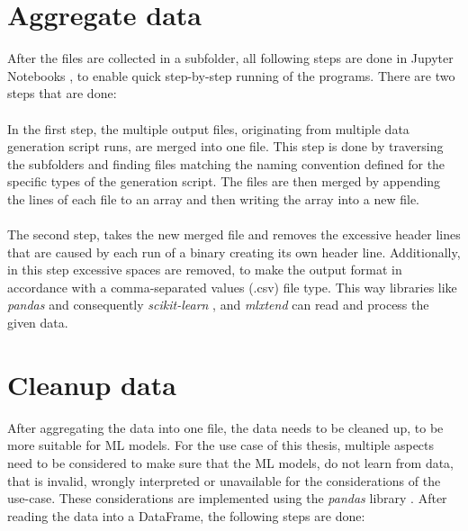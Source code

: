 \section{Aggregate data}

After the files are collected in a subfolder, all following steps are done in Jupyter Notebooks \parencite{jupyter:online}, to enable quick step-by-step running of the programs. There are two steps that are done: \\ \\
In the first step, the multiple output files, originating from multiple data generation script runs, are merged into one file. This step is done by traversing the subfolders and finding files matching the naming convention defined for the specific types of the generation script. The files are then merged by appending the lines of each file to an array and then writing the array into a new file.\\\\
The second step, takes the new merged file and removes the excessive header lines that are caused by each run of a binary creating its own header line. Additionally, in this step excessive spaces are removed, to make the output format in accordance with a comma-separated values (.csv) file type. This way libraries like \textit{pandas} \parencite{pandasdo55:online} and consequently \textit{scikit-learn} \parencite{scikitle99:online}, and \textit{mlxtend} \parencite{mlxtend35:online} can read and process the given data. 

\section{Cleanup data}

After aggregating the data into one file, the data needs to be cleaned up, to be more suitable for \ac{ML} models. For the use case of this thesis, multiple aspects need to be considered to make sure that the ML models, do not learn from data, that is invalid, wrongly interpreted or unavailable for the considerations of the use-case. These considerations are implemented using the \textit{pandas} library \parencite{pandasdo55:online}. After reading the data into a DataFrame, the following steps are done: \\
 
